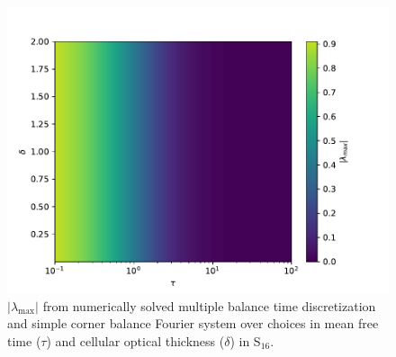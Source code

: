 \begin{figure}[htbp]
    \centering
    \includegraphics[width=0.75\linewidth]{manuscript2/man2_figs/mb_scb.pdf}
    \caption{$|\lambda_{\max}|$ from numerically solved multiple balance time discretization and simple corner balance Fourier system over choices in mean free time ($\tau$) and cellular optical thickness ($\delta$) in S$_{16}$.}
    \label{fig:mb-scb}
\end{figure}
